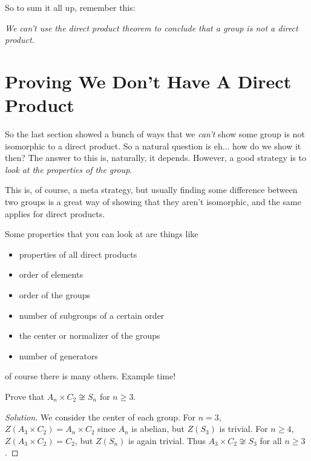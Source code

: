 \documentclass[11pt]{article}
\begin{document}
So to sum it all up, remember this:
\begin{center}
	\emph{We can't use the direct product theorem to conclude that a group is not a direct product.}
\end{center}

\section{Proving We Don't Have A Direct Product}

So the last section showed a bunch of ways that we \emph{can't} show some group is not isomorphic to a direct product. So a natural question is eh... how do we show it then? The answer to this is, naturally, it depends. However, a good strategy is to \emph{look at the properties of the group}.

This is, of course, a meta strategy, but usually finding some difference between two groups is a great way of showing that they aren't isomorphic, and the same applies for direct products.

Some properties that you can look at are things like
\begin{itemize}
	\item properties of all direct products
	\item order of elements
	\item order of the groups
	\item number of subgroups of a certain order
	\item the center or normalizer of the groups
	\item number of generators
\end{itemize}
of course there is many others. Example time!

\begin{example}
	Prove that $A_n \times C_2 \not \cong S_n$ for $n \geq 3$.
\end{example}
\begin{proof}[Solution]
	We consider the center of each group. For $n = 3$, $Z(A_3 \times C_2) = A_n \times C_2$ since $A_n$ is abelian, but $Z(S_3)$ is trivial. For $n \geq 4$, $Z(A_3 \times C_2) = C_2$, but $Z(S_n)$ is again trivial.
	Thus $A_3 \times C_2 \not \cong S_3$ for all $n \geq 3$.
\end{proof}
\end{document}
